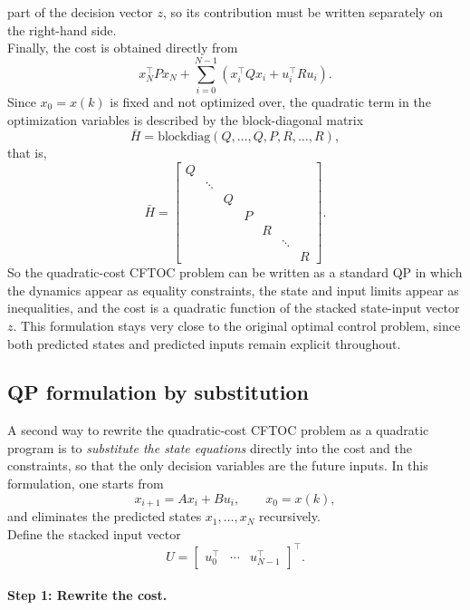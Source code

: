 part of the decision vector \(z\), so its contribution must be written separately on the
right-hand side.\\
Finally, the cost is obtained directly from
\[
x_N^\top P x_N+\sum_{i=0}^{N-1}\left(x_i^\top Qx_i+u_i^\top Ru_i\right).
\]
Since \(x_0=x(k)\) is fixed and not optimized over, the quadratic term in the optimization
variables is described by the block-diagonal matrix
\[
\bar H=
\mathrm{blockdiag}(Q,\dots,Q,P,R,\dots,R),
\]
that is,
\[
\bar H=
\begin{bmatrix}
Q &        &        &        &        &        \\
  & \ddots &        &        &        &        \\
  &        & Q      &        &        &        \\
  &        &        & P      &        &        \\
  &        &        &        & R      &        \\
  &        &        &        &        & \ddots \\
  &        &        &        &        &        & R
\end{bmatrix}.
\]
So the quadratic-cost CFTOC problem can be written as a standard QP in which the dynamics
appear as equality constraints, the state and input limits appear as inequalities, and the cost is
a quadratic function of the stacked state-input vector \(z\). This formulation stays very close to
the original optimal control problem, since both predicted states and predicted inputs remain
explicit throughout.
\subsection{QP formulation by substitution}

A second way to rewrite the quadratic-cost CFTOC problem as a quadratic program is to
\emph{substitute the state equations} directly into the cost and the constraints, so that the only
decision variables are the future inputs. In this formulation, one starts from
\[
x_{i+1}=Ax_i+Bu_i,\qquad x_0=x(k),
\]
and eliminates the predicted states \(x_1,\dots,x_N\) recursively.\\
Define the stacked input vector
\[
U=
\begin{bmatrix}
u_0^\top & \cdots & u_{N-1}^\top
\end{bmatrix}^\top.
\]

\paragraph{Step 1: Rewrite the cost.}

